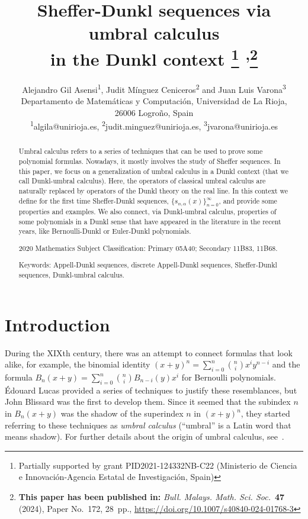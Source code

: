 \documentclass[11pt]{article}
\title{Sheffer-Dunkl sequences via umbral calculus\\
in the Dunkl context%
\footnote{Partially supported by grant PID2021-124332NB-C22 
(Mi\-nis\-te\-rio de Cien\-cia e Inno\-va\-ci\'on-Agen\-cia Esta\-tal de Inves\-ti\-ga\-ci\'on, Spain)}
\textsuperscript{,}\thanks{\textbf{This paper has been published in:} 
\textit{Bull. Malays. Math. Sci. Soc.}\ \textbf{47} (2024), Paper No.~172, 28~pp., 
\url{https://doi.org/10.1007/s40840-024-01768-3}}%
}
\author{Alejandro Gil Asensi\textsuperscript{1},  
Judit M\'inguez Ceniceros\textsuperscript{2}
and Juan Luis Varona\textsuperscript{3}\\[6pt]
  \small Departamento de Matem\'aticas y
  Computaci\'on, Universidad de La Rioja,\\[-2pt]
  \small 26006 Logro\~no, Spain\\[3pt]
  \small 
  \textsuperscript{1}{algila@unirioja.es},
  \textsuperscript{2}{judit.minguez@unirioja.es},
  \textsuperscript{3}{jvarona@unirioja.es}
}
\date{}
\theoremstyle{plain}
\theoremstyle{remark}
\numberwithin{equation}{section} %
\begin{document}

\maketitle

\begin{abstract}
Umbral calculus refers to a series of techniques that can be used to prove some polynomial formulas. Nowadays, it mostly involves the study of Sheffer sequences. In this paper, we focus on a generalization of umbral calculus in a Dunkl context (that we call Dunkl-umbral calculus). Here, the operators of classical umbral calculus are naturally replaced by operators of the Dunkl theory on the real line. In this context we define for the first time Sheffer-Dunkl sequences, $\{s_{n,\alpha}(x)\}_{n=0}^\infty$, and provide some properties and examples. We also connect, via Dunkl-umbral calculus, properties of some polynomials in a Dunkl sense that have appeared in the literature in the recent years, like Bernoulli-Dunkl or Euler-Dunkl polynomials.

2020 Mathematics Subject Classification: Primary 05A40; Secondary 11B83, 11B68.

Keywords: Appell-Dunkl sequences, discrete Appell-Dunkl sequences, Sheffer-Dunkl sequences, Dunkl-umbral calculus.
\end{abstract}

\section{Introduction}

During the XIXth century, there was an attempt to connect formulas that look alike, for example, the binomial identity $(x+y)^n = \sum_{i=0}^n \binom{n}{i}x^i y^{n-i}$ and the formula $B_n(x+y) = \sum_{i=0}^n \binom{n}{i} B_{n-i}(y)x^i$ for Bernoulli polynomials. \'Edouard Lucas provided a series of techniques to justify these resemblances, but John Blissard was the first to develop them. Since it seemed that the subindex $n$ in $B_{n}(x+y)$ was the shadow of the superindex $n$ in $(x+y)^n$, they started referring to these techniques as \textit{umbral calculus} (``umbral'' is a Latin word that means shadow). For further details about the origin of umbral calculus, see~\cite{Bell}.
\end{document}

